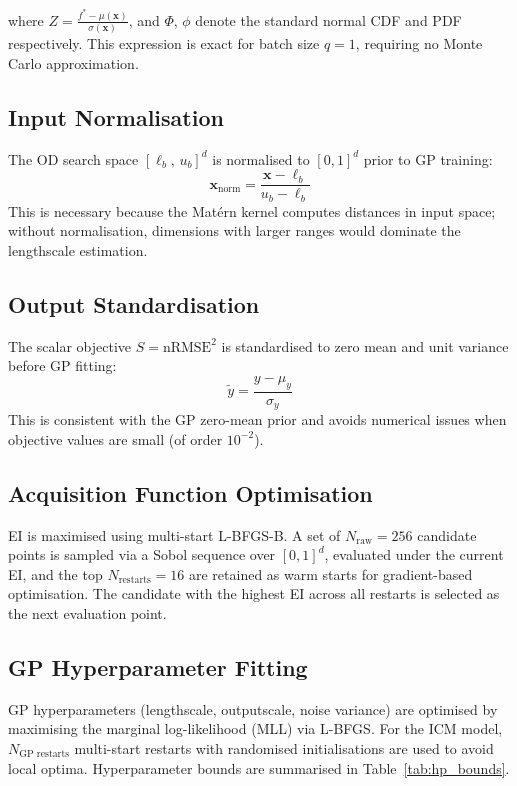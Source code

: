 \documentclass[11pt]{article}
\begin{document}
where $Z = \frac{f^* - \mu(\mathbf{x})}{\sigma(\mathbf{x})}$, and $\Phi$, $\phi$ denote 
the standard normal CDF and PDF respectively. This expression is exact for batch size 
$q=1$, requiring no Monte Carlo approximation.

\subsection{Input Normalisation}

The OD search space $[\ell_b,\, u_b]^d$ is normalised to $[0,1]^d$ prior to GP training:
\begin{equation}
    \mathbf{x}_{\text{norm}} = \frac{\mathbf{x} - \ell_b}{u_b - \ell_b}
\end{equation}
This is necessary because the Mat\'{e}rn kernel computes distances in input space; 
without normalisation, dimensions with larger ranges would dominate the lengthscale 
estimation.

\subsection{Output Standardisation}

The scalar objective $S = \text{nRMSE}^2$ is standardised to zero mean and unit 
variance before GP fitting:
\begin{equation}
    \tilde{y} = \frac{y - \mu_y}{\sigma_y}
\end{equation}
This is consistent with the GP zero-mean prior and avoids numerical issues when 
objective values are small (of order $10^{-2}$).

\subsection{Acquisition Function Optimisation}

EI is maximised using multi-start L-BFGS-B. A set of $N_{\text{raw}} = 256$ 
candidate points is sampled via a Sobol sequence over $[0,1]^d$, evaluated under 
the current EI, and the top $N_{\text{restarts}} = 16$ are retained as warm starts 
for gradient-based optimisation. The candidate with the highest EI across all 
restarts is selected as the next evaluation point.

\subsection{GP Hyperparameter Fitting}

GP hyperparameters (lengthscale, outputscale, noise variance) are optimised by 
maximising the marginal log-likelihood (MLL) via L-BFGS. For the ICM model, 
$N_{\text{GP restarts}}$ multi-start restarts with randomised initialisations are 
used to avoid local optima. Hyperparameter bounds are summarised in 
Table~\ref{tab:hp_bounds}.
\end{document}
